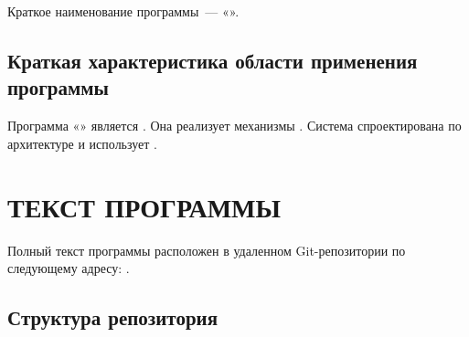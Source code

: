 \documentclass[12pt,a4paper]{extarticle}
\begin{document}
Краткое наименование программы~--- «\hseProjectNameShort».

\subsection{Краткая характеристика области применения программы}

Программа «\projectname» является . Она реализует механизмы . Система спроектирована по  архитектуре и использует .

\clearpage

\section{ТЕКСТ ПРОГРАММЫ}

Полный текст программы расположен в удаленном Git-репозитории по следующему адресу: . 

\subsection{Структура репозитория}
\end{document}
